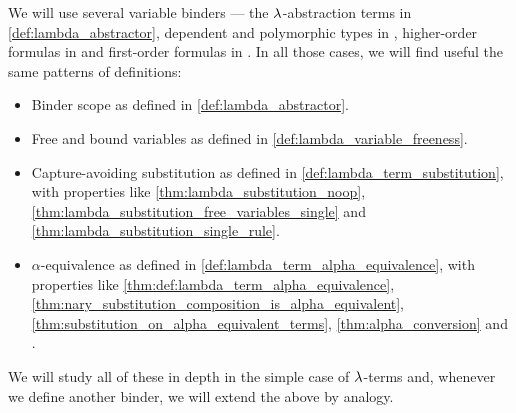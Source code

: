 \begin{remark}\label{rem:variable_binding_properties}
  We will use several variable binders --- the \( {\mathrm \lambda} \)-abstraction terms in \cref{def:lambda_abstractor}, dependent and polymorphic types in , higher-order formulas in  and first-order formulas in . In all those cases, we will find useful the same patterns of definitions:
  \begin{itemize}
    \item Binder scope as defined in \cref{def:lambda_abstractor}.
    \item Free and bound variables as defined in \cref{def:lambda_variable_freeness}.
    \item Capture-avoiding substitution as defined in \cref{def:lambda_term_substitution}, with properties like \cref{thm:lambda_substitution_noop}, \cref{thm:lambda_substitution_free_variables_single} and \cref{thm:lambda_substitution_single_rule}.
    \item \( \alpha \)-equivalence as defined in \cref{def:lambda_term_alpha_equivalence}, with properties like \cref{thm:def:lambda_term_alpha_equivalence}, \cref{thm:nary_substitution_composition_is_alpha_equivalent}, \cref{thm:substitution_on_alpha_equivalent_terms}, \cref{thm:alpha_conversion} and .
  \end{itemize}

  We will study all of these in depth in the simple case of \( {\mathrm \lambda} \)-terms and, whenever we define another binder, we will extend the above by analogy.
\end{remark}

